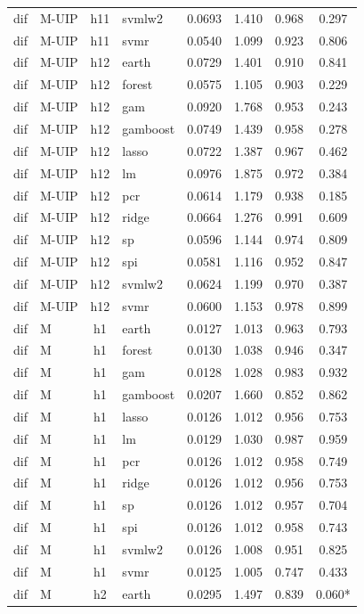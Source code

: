 \begin{ThreePartTable}
\begin{longtable}[t]{llclcccc}
dif & M-UIP & h11 & svmlw2 & 0.0693 & 1.410 & 0.968 & 0.297\\
dif & M-UIP & h11 & svmr & 0.0540 & 1.099 & 0.923 & 0.806\\
\addlinespace
dif & M-UIP & h12 & earth & 0.0729 & 1.401 & 0.910 & 0.841\\
dif & M-UIP & h12 & forest & 0.0575 & 1.105 & 0.903 & 0.229\\
dif & M-UIP & h12 & gam & 0.0920 & 1.768 & 0.953 & 0.243\\
dif & M-UIP & h12 & gamboost & 0.0749 & 1.439 & 0.958 & 0.278\\
dif & M-UIP & h12 & lasso & 0.0722 & 1.387 & 0.967 & 0.462\\
dif & M-UIP & h12 & lm & 0.0976 & 1.875 & 0.972 & 0.384\\
dif & M-UIP & h12 & pcr & 0.0614 & 1.179 & 0.938 & 0.185\\
dif & M-UIP & h12 & ridge & 0.0664 & 1.276 & 0.991 & 0.609\\
dif & M-UIP & h12 & sp & 0.0596 & 1.144 & 0.974 & 0.809\\
dif & M-UIP & h12 & spi & 0.0581 & 1.116 & 0.952 & 0.847\\
dif & M-UIP & h12 & svmlw2 & 0.0624 & 1.199 & 0.970 & 0.387\\
dif & M-UIP & h12 & svmr & 0.0600 & 1.153 & 0.978 & 0.899\\
\addlinespace
dif & M & h1 & earth & 0.0127 & 1.013 & 0.963 & 0.793\\
dif & M & h1 & forest & 0.0130 & 1.038 & 0.946 & 0.347\\
dif & M & h1 & gam & 0.0128 & 1.028 & 0.983 & 0.932\\
dif & M & h1 & gamboost & 0.0207 & 1.660 & 0.852 & 0.862\\
dif & M & h1 & lasso & 0.0126 & 1.012 & 0.956 & 0.753\\
dif & M & h1 & lm & 0.0129 & 1.030 & 0.987 & 0.959\\
dif & M & h1 & pcr & 0.0126 & 1.012 & 0.958 & 0.749\\
dif & M & h1 & ridge & 0.0126 & 1.012 & 0.956 & 0.753\\
dif & M & h1 & sp & 0.0126 & 1.012 & 0.957 & 0.704\\
dif & M & h1 & spi & 0.0126 & 1.012 & 0.958 & 0.743\\
dif & M & h1 & svmlw2 & 0.0126 & 1.008 & 0.951 & 0.825\\
dif & M & h1 & svmr & 0.0125 & 1.005 & 0.747 & 0.433\\
\addlinespace
dif & M & h2 & earth & 0.0295 & 1.497 & 0.839 & 0.060*\\

\end{longtable}
\end{ThreePartTable}
